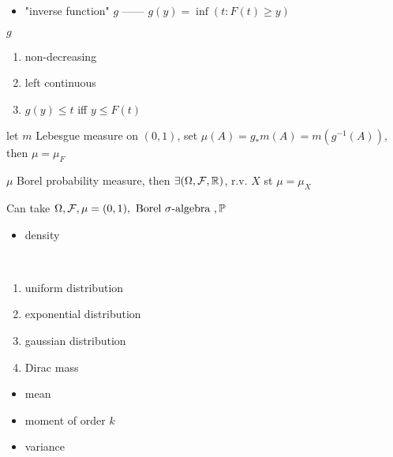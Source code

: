 \begin{itemize}
    \item "inverse function" $g$ ------ $g(y) = \inf(t : F(t) \geq y)$
\end{itemize}

\begin{lemma}
    $g$
    \begin{enumerate}
        \item non-decreasing
        \item left continuous
        \item $g(y) \leq t$ iff $y \leq F(t)$
    \end{enumerate}
\end{lemma}

\begin{fact}
    let $m$ Lebesgue measure on $(0, 1)$, set $\mu(A) = g_{*}m(A) = m(g^{-1}(A))$, then $\mu = \mu_F$
\end{fact}

\begin{prop}
    $\mu$ Borel probability measure, then $\exists (\Omega, \mathcal{F}, \mathbb{R})$, r.v. $X$ st $\mu = \mu_X$
\end{prop}

\begin{fact}
    Can take $\Omega, \mathcal{F}, \mu = (0, 1), \text{ Borel }\sigma\text{-algebra }, \mathbb{P}$
\end{fact}

\begin{itemize}
    \item density
\end{itemize}

\begin{example}\,
    \begin{enumerate}
        \item uniform distribution
        \item exponential distribution
        \item gaussian distribution
        \item Dirac mass
    \end{enumerate}
\end{example}

\begin{itemize}
    \item mean
    \item moment of order $k$
    \item variance
\end{itemize}